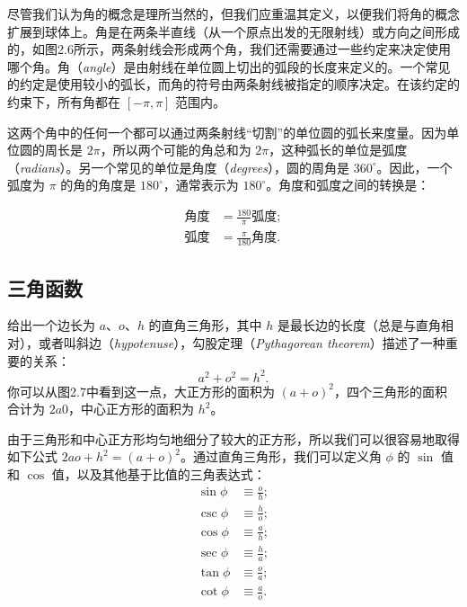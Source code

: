 尽管我们认为角的概念是理所当然的，但我们应重温其定义，以便我们将角的概念扩展到球体上。角是在两条半直线（从一个原点出发的无限射线）或方向之间形成的，如图2.6所示，两条射线会形成两个角，我们还需要通过一些约定来决定使用哪个角。角（\textit{angle}）是由射线在单位圆上切出的弧段的长度来定义的。一个常见的约定是使用较小的弧长，而角的符号由两条射线被指定的顺序决定。在该约定的约束下，所有角都在 $[-\pi, \pi]$ 范围内。

这两个角中的任何一个都可以通过两条射线“切割”的单位圆的弧长来度量。因为单位圆的周长是 $2\pi$，所以两个可能的角总和为 $2\pi$，这种弧长的单位是弧度（\textit{radians}）。另一个常见的单位是角度（\textit{degrees}），圆的周角是 $360^\circ$。因此，一个弧度为 $\pi$ 的角的角度是 $180^\circ$，通常表示为 $180^\circ$。角度和弧度之间的转换是：

\[
  \begin{aligned}
    \text{角度} & =\frac{180}{\pi} \text{弧度}; \\
    \text{弧度} & =\frac{\pi}{180} \text{角度}.
  \end{aligned}
\]

\subsection{三角函数}


给出一个边长为 $a$、$o$、$h$ 的直角三角形，其中 $h$ 是最长边的长度（总是与直角相对），或者叫斜边（\textit{hypotenuse}），勾股定理（\textit{Pythagorean theorem}）描述了一种重要的关系：
\[
  a^2+o^2=h^2.
\]
你可以从图2.7中看到这一点，大正方形的面积为 $(a+o)^2$，四个三角形的面积合计为 $2a0$，中心正方形的面积为 $h^2$。

由于三角形和中心正方形均匀地细分了较大的正方形，所以我们可以很容易地取得如下公式 $2ao+h^2=(a+o)^2$。通过直角三角形，我们可以定义角 $\phi$ 的 $\sin$ 值和 $\cos$ 值，以及其他基于比值的三角表达式：
\[
  \begin{aligned}
    \sin \phi & \equiv \frac{o}{h}; \\
    \csc \phi & \equiv \frac{h}{o}; \\
    \cos \phi & \equiv \frac{a}{h}; \\
    \sec \phi & \equiv \frac{h}{a}; \\
    \tan \phi & \equiv \frac{o}{a}; \\
    \cot \phi & \equiv \frac{a}{o}.
  \end{aligned}
\]

